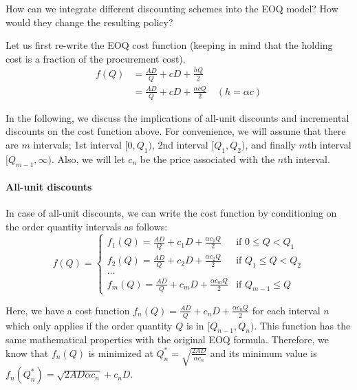 \begin{exercise}
How can we integrate different discounting schemes into the EOQ model? How would they change the resulting policy?


\begin{solution}
Let us first re-write the EOQ cost function (keeping in mind that the holding cost is a fraction of the procurement cost). 
\begin{align*}
f(Q) 
& = \frac{AD}{Q} + cD + \frac{hQ}{2} \\
& = \frac{AD}{Q} + cD + \frac{\alpha cQ}{2} \quad (h = \alpha c) 
\end{align*}

In the following, we discuss the implications of all-unit discounts and incremental discounts on the cost function above. For convenience, we will assume that there are $m$ intervals; 1st interval $[0,Q_1)$, 2nd interval $[Q_1,Q_2)$, and finally $m$th interval $[Q_{m-1},\infty)$. Also, we will let $c_n$ be the price associated with the $n$th interval. 

\paragraph{All-unit discounts}

In case of all-unit discounts, we can write the cost function by conditioning on the order quantity intervals as follows:
\begin{equation*}
f(Q) = 
\begin{cases}
f_1(Q) = \frac{AD}{Q} + c_1D + \frac{\alpha c_1 Q}{2} & \text{if } 0 \leq Q < Q_1 \\
f_2(Q) = \frac{AD}{Q} + c_2D + \frac{\alpha c_2 Q}{2} & \text{if } Q_1 \leq Q < Q_2 \\
\ldots \\
f_m(Q) = \frac{AD}{Q} + c_mD + \frac{\alpha c_m Q}{2} & \text{if } Q_{m-1} \leq Q 
\end{cases}
\end{equation*}

Here, we have a cost function $f_n(Q) = \frac{AD}{Q} + c_nD + \frac{\alpha c_n Q}{2}$ for each interval $n$ which only applies if the order quantity $Q$ is in $[Q_{n-1},Q_n)$. This function has the same mathematical properties with the original EOQ formula. Therefore, we know that $f_n(Q)$ is minimized at $Q^*_n=\sqrt{\frac{2AD}{\alpha c_n}}$ and its minimum value is $f_n(Q^*_n)=\sqrt{2AD\alpha c_n}+c_n D$.


\end{solution}
\end{exercise}
